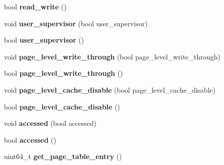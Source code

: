 \begin{DoxyCompactItemize}
\hypertarget{classintel64__page__entry__base_a94f2ccab5f9071c6c74ddfa7fc007452}{}\label{classintel64__page__entry__base_a94f2ccab5f9071c6c74ddfa7fc007452} 
bool {\bfseries read\+\_\+write} ()
\item 
\hypertarget{classintel64__page__entry__base_a9cc519025452738d236cae4d96ccb541}{}\label{classintel64__page__entry__base_a9cc519025452738d236cae4d96ccb541} 
void {\bfseries user\+\_\+supervisor} (bool user\+\_\+supervisor)
\item 
\hypertarget{classintel64__page__entry__base_ab854b032b6e9617b009c924411e15b48}{}\label{classintel64__page__entry__base_ab854b032b6e9617b009c924411e15b48} 
bool {\bfseries user\+\_\+supervisor} ()
\item 
\hypertarget{classintel64__page__entry__base_a5871c3a2bef99de0e2d8c351bc5709e1}{}\label{classintel64__page__entry__base_a5871c3a2bef99de0e2d8c351bc5709e1} 
void {\bfseries page\+\_\+level\+\_\+write\+\_\+through} (bool page\+\_\+level\+\_\+write\+\_\+through)
\item 
\hypertarget{classintel64__page__entry__base_a949e0e8fec5de738ae9bf6c27b7a7ff3}{}\label{classintel64__page__entry__base_a949e0e8fec5de738ae9bf6c27b7a7ff3} 
bool {\bfseries page\+\_\+level\+\_\+write\+\_\+through} ()
\item 
\hypertarget{classintel64__page__entry__base_a7d3cd7dbf83dd8eaa46d398b3aa3a2f8}{}\label{classintel64__page__entry__base_a7d3cd7dbf83dd8eaa46d398b3aa3a2f8} 
void {\bfseries page\+\_\+level\+\_\+cache\+\_\+disable} (bool page\+\_\+level\+\_\+cache\+\_\+disable)
\item 
\hypertarget{classintel64__page__entry__base_aa97e30b93572177a13606507b5c3eea1}{}\label{classintel64__page__entry__base_aa97e30b93572177a13606507b5c3eea1} 
bool {\bfseries page\+\_\+level\+\_\+cache\+\_\+disable} ()
\item 
\hypertarget{classintel64__page__entry__base_a7af8cc00e2a9d8988f8cb251ce572274}{}\label{classintel64__page__entry__base_a7af8cc00e2a9d8988f8cb251ce572274} 
void {\bfseries accessed} (bool accessed)
\item 
\hypertarget{classintel64__page__entry__base_a80d246aec4d6179761a2a696feb647b6}{}\label{classintel64__page__entry__base_a80d246aec4d6179761a2a696feb647b6} 
bool {\bfseries accessed} ()
\item 
\hypertarget{classintel64__page__entry__base_af29247f033cfcf35ed36abaa219f3291}{}\label{classintel64__page__entry__base_af29247f033cfcf35ed36abaa219f3291} 
uint64\+\_\+t {\bfseries get\+\_\+page\+\_\+table\+\_\+entry} ()
\end{DoxyCompactItemize}
